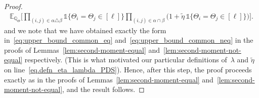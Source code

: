 \documentclass[11pt, letterpaper]{article}
\numberwithin{equation}{section}
\newcommand{\QQ}{\mathbb{Q}}
\begin{document}
\begin{proof}
\begin{align*}
\mathbb{E}_{ \QQ_\Theta}\Bigg[
\prod_{(i,j)\in\alpha\triangle\beta}\mathds{1}\{\Theta_i=\Theta_j\in[\ell]\} 
\prod_{(i,j)\in\alpha\cap\beta}\Big(1+\tilde\eta\,\mathds{1}\{\Theta_i=\Theta_j\in[\ell]\}\Big)
\Bigg].
\end{align*}
 and we note that we have obtained exactly the form in~\eqref{eq:upper_bound_common_eq} and~\eqref{eq:upper_bound_common_neq} in the proofs of Lemmas~\ref{lem:second-moment-equal} and~\ref{lem:second-moment-not-equal} respectively. (This is what motivated our particular definitions of~$\lambda$ and $\tilde\eta$ on line~\eqref{eq.defn_eta_lambda_PDS}). Hence, after this step, the proof proceeds exactly as in the proofs of Lemmas~\ref{lem:second-moment-equal} and~\ref{lem:second-moment-not-equal}, and the result follows.
\end{proof}
\end{document}
